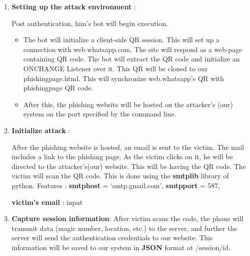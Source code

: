 \documentclass[12pt]{report}
\renewcommand{\_}{\kern-1.5pt\textunderscore\kern-1.5pt}
\begin{document}
\begin{enumerate}
\vspace{\baselineskip}
	\item \textbf{Setting up the attack environment} :\par

\begin{FlushLeft}
Post authentication, him’s bot will begin execution.
\end{FlushLeft}\par

\begin{itemize}
	\item The bot will initialize a client-side QR session. This will set up a connection with web.whatsapp.com. The site will respond as a web-page containing QR code. The bot will extract the QR code and initialize an ONCHANGE Listener over it. This QR will be cloned to our phishing\_page.html. This will synchronize web.whatsapp’s QR with phishing\_page QR code. \par

	\item After this, the phishing website will be hosted on the attacker’s (our) system on the port specified by the command line.
\end{itemize}\par


\vspace{\baselineskip}
	\item \textbf{Initialize attack} :\par

After the phishing website is hosted, an email is sent to the victim. The mail includes a link to the phishing page. As the victim clicks on it, he will be directed to the attacker’s(our) website. This will be having the QR code. The victim will scan the QR code. This is done using the \textbf{smtplib} library of python. Features : \textbf{smtp\_host} = ‘smtp.gmail.com’, \textbf{smtp\_port} = 587, \par

\textbf{victim’s email} : input\par


\vspace{\baselineskip}
	\item \textbf{Capture session information}: After victim scans the code, the phone will transmit data (magic number, location, etc.) to the server, and further the server will send the authentication credentials to our website. This information will be saved to our system in \textbf{JSON} format at /session/id.\par



\end{enumerate}
\end{document}
